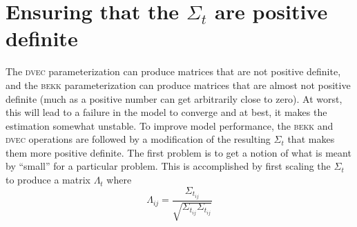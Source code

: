 \section{Ensuring that the $\Sigma_t$ are positive definite}

The \textsc{dvec} parameterization can produce matrices that are not
positive definite, and the \textsc{bekk} parameterization can produce matrices
that are almost not positive definite (much as a positive number can
get arbitrarily close to zero). At worst, this will lead to a failure
in the model to converge and at best, it makes the estimation somewhat
unstable. To improve model performance, the \textsc{bekk} and \textsc{dvec}
operations are followed by a modification of the resulting $\Sigma_t$ that
 makes them more positive definite. The first problem is to get a notion of what is meant by ``small'' for a particular problem. 
This is accomplished by first scaling the 
$\Sigma_t$ to produce a matrix $\Lambda_t$ where
\begin{equation}
  \Lambda_{ij}=\frac{\Sigma_{t_{ij}}}{\sqrt{\Sigma_{t_{ij}}\Sigma_{t_{ij}}}}
\end{equation}
